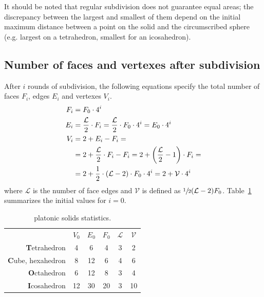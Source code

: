 \documentclass{article}
\begin{document}
It should be noted that regular subdivision does not guarantee equal areas; the discrepancy between the largest and smallest of them depend on the initial maximum distance between a point on the solid and the circumscribed sphere (e.g. largest on a tetrahedron, smallest for an icosahedron).

\subsection{Number of faces and vertexes after subdivision}

After $i$ rounds of subdivision, the following equations specify the total number of faces $F_i$, edges $E_i$ and vertexes $V_i$.
%
\begin{align}
F_i &= F_0 \cdot 4^i \label{eq:fcount} \\
E_i &= \frac{\mathcal{L}}{2} \cdot  F_i = \frac{\mathcal{L}}{2} \cdot F_0 \cdot 4^i = E_0 \cdot 4^i \label{eq:ecount} \\
V_i &= 2 + E_i - F_i = \notag \\
    &= 2 + \frac{\mathcal{L}}{2} \cdot F_i - F_i = 2 + \left( \frac{\mathcal{L}}{2} - 1 \right) \cdot F_i = \notag \\
    &= 2 + \frac{1}{2} \cdot (\mathcal{L} - 2) \cdot F_0 \cdot 4^i = 2 + \mathcal{V} \cdot 4^i \label{eq:vcount}
\end{align}
%
where $\mathcal{L}$ is the number of face edges and $\mathcal{V}$ is defined as $\sfrac{1}{2} (\mathcal{L} - 2) F_0$. Table~\ref{tab:polyfacts} summarizes the initial values for $i=0$.
%
\begin{table}[htb]
\centering
\begin{tabular}{ r c c c c c }
 & $V_0$ & $E_0$ & $F_0$ & $\mathcal{L}$ & $\mathcal{V}$ \\
\textbf{T}etrahedron & 4 & 6 & 4 & 3 & 2 \\
\textbf{C}ube, hexahedron & 8 & 12 & 6 & 4 & 6 \\
\textbf{O}ctahedron & 6 & 12 & 8 & 3 & 4\\
\textbf{I}cosahedron & 12 & 30 & 20 & 3 & 10
\end{tabular}
\caption{platonic solids statistics.}
\label{tab:polyfacts}
\end{table}
\end{document}
